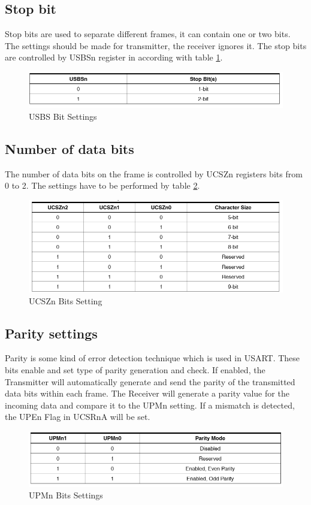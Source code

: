 \documentclass[english]{article}
\begin{document}
\subsection{Stop bit}
Stop bits are used to separate different frames, it can contain one or two bits. The settings should be made for transmitter, the receiver ignores it. The stop bits are controlled by USBSn register in according with table \ref{tab:USBS}.
\begin{figure}[H]
  \centering
  \includegraphics[scale=0.8]{MicroLab4/USBS}
  \caption{USBS Bit Settings} \label{tab:USBS} 
\end{figure}
\subsection{Number of data bits}
The number of data bits on the frame is controlled by UCSZn registers bits from 0 to 2. The settings have to be performed by table \ref{tab:UCSZ}.
\begin{figure}[H]
  \centering
  \includegraphics[scale=0.8]{MicroLab4/UCSZ}
  \caption{UCSZn Bits Setting} \label{tab:UCSZ} 
\end{figure}
\subsection{Parity settings}
Parity is some kind of error detection technique which is used in USART.
These bits enable and set type of parity generation and check. If enabled, the Transmitter will
automatically generate and send the parity of the transmitted data bits within each frame. The Receiver will generate a parity value for the incoming data and compare it to the UPMn setting. If a mismatch is detected, the UPEn Flag in UCSRnA will be set.
\begin{figure}[H]
  \centering
  \includegraphics[scale=0.8]{MicroLab4/UPM}
  \caption{UPMn Bits Settings} 
\end{figure}
\end{document}
